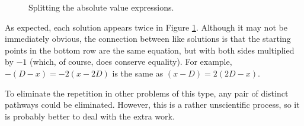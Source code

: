 \documentclass[titlepage]{article}
\begin{document}
\begin{figure}[h!]
    \centering
    \caption{Splitting the absolute value expressions.}
    \label{fig:tree}
\end{figure}

As expected, each solution appears twice in Figure \ref{fig:tree}. Although it may not be immediately obvious, the connection between like solutions is that the starting points in the bottom row are the same equation, but with both sides multiplied by $-1$ (which, of course, does conserve equality). For example, $-(D-x)=-2(x-2D)$ is the same as $(x-D)=2(2D-x)$.\par
To eliminate the repetition in other problems of this type, any pair of distinct pathways could be eliminated. However, this is a rather unscientific process, so it is probably better to deal with the extra work.
\end{document}
